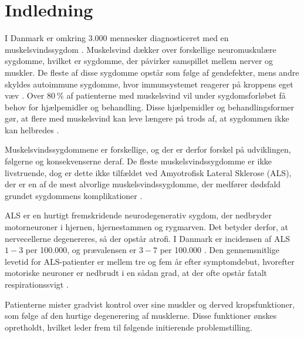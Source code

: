 \chapter{Indledning} \label{sec:indledning}



I Danmark er omkring 3.000 mennesker diagnosticeret med en muskelsvindssygdom \citep{universitet2013}. 
Muskelsvind dækker over forskellige neuromuskulære sygdomme, hvilket er sygdomme, der påvirker samspillet mellem nerver og muskler.%
De fleste af disse sygdomme opstår som følge af gendefekter, mens andre skyldes autoimmune sygdomme, hvor immunsystemet reagerer på kroppens eget væv \citep{arahata2014}. 
Over $80~\%$ af patienterne med muskelsvind vil under sygdomsforløbet få behov for hjælpemidler og behandling. 
Disse hjælpemidler og behandlingsformer gør, at flere med muskelsvind kan leve længere på trods af, at sygdommen ikke kan helbredes \citep{hvadermuskelsvind2016}. 

Muskelsvindssygdommene er forskellige, og der er derfor forskel på udviklingen, følgerne og konsekvenserne deraf. 
De fleste muskelsvindssygdomme er ikke livstruende, dog er dette ikke tilfældet ved Amyotrofisk Lateral Sklerose (ALS), der er en af de mest alvorlige muskelsvindssygdomme, der medfører dødsfald grundet sygdommens komplikationer \citep{henschke2012}. 

ALS er en hurtigt fremskridende neurodegenerativ sygdom, der nedbryder motorneuroner i hjernen, hjernestammen og rygmarven. 
Det betyder derfor, at nervecellerne degenereres, så der opstår atrofi.%
I Danmark er incidensen af ALS $1-3$ per 100.000, og prævalensen er $3-7$ per 100.000 \citep{russell2015}. 
Den gennemsnitlige levetid for ALS-patienter er mellem tre og fem år efter symptomdebut, hvorefter motoriske neuroner er nedbrudt i en sådan grad, at der ofte opstår fatalt respirationssvigt \citep{grehl2011, morris2015}.

Patienterne mister gradvist kontrol over sine muskler og derved kropsfunktioner, som følge af den hurtige degenerering af musklerne\citep{ilse2015}. 
Disse funktioner ønskes opretholdt, hvilket leder frem til følgende initierende problemstilling. 
 
